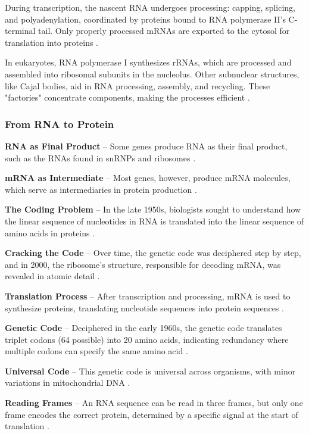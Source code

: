 During transcription, the nascent RNA undergoes processing: capping, splicing, and polyadenylation, coordinated by proteins bound to RNA polymerase II’s C-terminal tail. Only properly processed mRNAs are exported to the cytosol for translation into proteins \cite*{L1-Chapter6}.

In eukaryotes, RNA polymerase I synthesizes rRNAs, which are processed and assembled into ribosomal subunits in the nucleolus. Other subnuclear structures, like Cajal bodies, aid in RNA processing, assembly, and recycling. These "factories" concentrate components, making the processes efficient \cite*{L1-Chapter6}.

\subsubsection*{From RNA to Protein}
\textbf{RNA as Final Product} – Some genes produce RNA as their final product, such as the RNAs found in snRNPs and ribosomes \cite*{L1-Chapter6}.

\textbf{mRNA as Intermediate} – Most genes, however, produce mRNA molecules, which serve as intermediaries in protein production \cite*{L1-Chapter6}.

\textbf{The Coding Problem} – In the late 1950s, biologists sought to understand how the linear sequence of nucleotides in RNA is translated into the linear sequence of amino acids in proteins \cite*{L1-Chapter6}.

\textbf{Cracking the Code} – Over time, the genetic code was deciphered step by step, and in 2000, the ribosome’s structure, responsible for decoding mRNA, was revealed in atomic detail \cite*{L1-Chapter6}.

\textbf{Translation Process} – After transcription and processing, mRNA is used to synthesize proteins, translating nucleotide sequences into protein sequences \cite*{L1-Chapter6}.

\textbf{Genetic Code} – Deciphered in the early 1960s, the genetic code translates triplet codons (64 possible) into 20 amino acids, indicating redundancy where multiple codons can specify the same amino acid \cite*{L1-Chapter6}.

\textbf{Universal Code} – This genetic code is universal across organisms, with minor variations in mitochondrial DNA \cite*{L1-Chapter6}.

\textbf{Reading Frames} – An RNA sequence can be read in three frames, but only one frame encodes the correct protein, determined by a specific signal at the start of translation \cite*{L1-Chapter6}.

